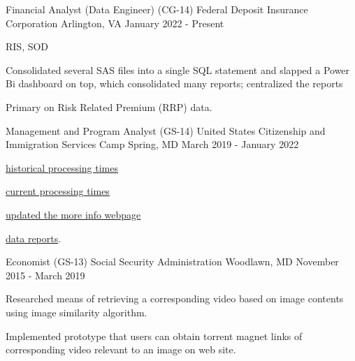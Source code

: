


\begin{cventries}


\cventry
{Financial Analyst (Data Engineer) (CG-14)} %
{Federal Deposit Insurance Corporation} %
{Arlington, VA} %
{January 2022 - Present} %
{ %
\begin{cvitems}
\item {RIS, SOD}
\item {Consolidated several SAS files into a single SQL statement and slapped a Power Bi dashboard on top, which consolidated many reports; centralized the reports}
\item {Primary on Risk Related Premium (RRP) data.}
\end{cvitems}
}


\cventry
{Management and Program Analyst (GS-14)} %
{United States Citizenship and Immigration Services} %
{Camp Spring, MD} %
{March 2019 - January 2022} %
{ %
\begin{cvitems}
\item {\href{https://egov.uscis.gov/processing-times/historic-pt}{historical processing times}}
\item {\href{https://egov.uscis.gov/processing-times/}{current processing times}}
\item {\href{https://egov.uscis.gov/processing-times/more-info}{updated the more info webpage}}
\item {\href{https://www.uscis.gov/tools/reports-and-studies/immigration-and-citizenship-data}{data reports}.}
\end{cvitems}
}


\cventry
{Economist (GS-13)} %
{Social Security Administration} %
{Woodlawn, MD} %
{November 2015 - March 2019} %
{ %
\begin{cvitems}
\item {Researched means of retrieving a corresponding video based on image contents using image similarity algorithm.}
\item {Implemented prototype that users can obtain torrent magnet links of corresponding video relevant to an image on web site.}
\end{cvitems} 
}


\end{cventries}
